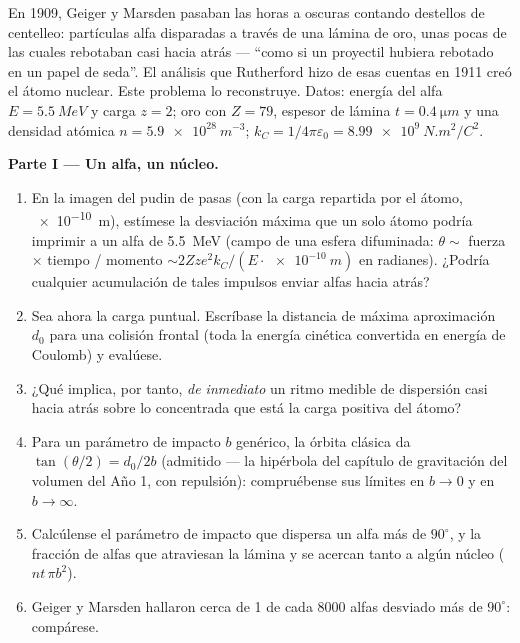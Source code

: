 \begin{problem}\label{pb:b3:scattering-theory:1}
En 1909, Geiger y Marsden pasaban las horas a oscuras contando destellos de
centelleo: partículas alfa disparadas a través de una lámina de oro, unas
pocas de las cuales rebotaban casi hacia atrás --- ``como si un proyectil
hubiera rebotado en un papel de seda''. El análisis que Rutherford hizo de
esas cuentas en 1911 creó el átomo nuclear. Este problema lo reconstruye.
Datos: energía del alfa $E =
\qty{5.5}{MeV}$ y carga $z = 2$; oro con $Z = 79$, espesor de lámina $t
= \qty{0.4}{\micro m}$ y una densidad atómica $n = \qty{5.9e28}{m^{-3}}$; $k_C =
1/4\pi\varepsilon_0 = \qty{8.99e9}{N.m^2/C^2}$.

\medskip\noindent\textbf{Parte I --- Un alfa, un núcleo.}
\begin{enumerate}
  \item En la imagen del pudin de pasas (con la carga repartida por el
        átomo, \qty{e-10}{m}), estímese la desviación máxima que un solo
        átomo podría imprimir a un alfa de \qty{5.5}{MeV} (campo de una
        esfera difuminada: $\theta \sim$ fuerza $\times$ tiempo / momento
        $\sim 2Zze^2k_C/(E\cdot\qty{e-10}{m})$ en radianes). ¿Podría
        cualquier acumulación de tales impulsos enviar alfas hacia atrás?
  \item Sea ahora la carga puntual. Escríbase la distancia de máxima
        aproximación $d_0$ para una colisión frontal (toda la energía
        cinética convertida en energía de Coulomb) y evalúese.
  \item ¿Qué implica, por tanto, \emph{de inmediato} un ritmo medible de
        dispersión casi hacia atrás sobre lo concentrada que está la
        carga positiva del átomo?
  \item Para un parámetro de impacto $b$ genérico, la órbita clásica da
        $\tan(\theta/2) = d_0/2b$ (admitido --- la hipérbola del capítulo
        de gravitación del volumen del Año 1, con repulsión): compruébense
        sus límites en $b \to 0$ y en $b \to
        \infty$.
  \item Calcúlense el parámetro de impacto que dispersa un alfa más de
        $90^\circ$, y la fracción de alfas que atraviesan la lámina y
        se acercan tanto a algún núcleo ($n t\,\pi
        b^2$).
  \item Geiger y Marsden hallaron cerca de 1 de cada 8000 alfas desviado
        más de $90^\circ$: compárese.
\end{enumerate}


\end{problem}
